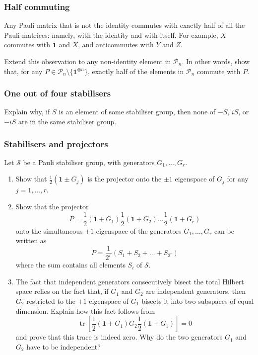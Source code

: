 \documentclass[fleqn,a4paper]{article}
\providecommand{\tightlist}{\setlength{\itemsep}{0pt}\setlength{\parskip}{0pt}}
\theoremstyle{definition}
\theoremstyle{definition}
\theoremstyle{definition}
\theoremstyle{definition}
\theoremstyle{remark}
\begin{document}
\hypertarget{half-commuting}{%
\subsubsection{Half commuting}\label{half-commuting}}

Any Pauli matrix that is not the identity commutes with exactly half of all the Pauli matrices: namely, with the identity and with itself.
For example, \(X\) commutes with \(\mathbf{1}\) and \(X\), and anticommutes with \(Y\) and \(Z\).

Extend this observation to any non-identity element in \(\mathcal{P}_n\).
In other words, show that, for any \(P\in\mathcal{P}_n\setminus\{\mathbf{1}^{\otimes n}\}\), exactly half of the elements in \(\mathcal{P}_n\) commute with \(P\).

\hypertarget{one-out-of-four-stabilisers}{%
\subsubsection{One out of four stabilisers}\label{one-out-of-four-stabilisers}}

Explain why, if \(S\) is an element of some stabiliser group, then none of \(-S\), \(iS\), or \(-iS\) are in the same stabiliser group.

\hypertarget{stabilisers-and-projectors}{%
\subsubsection{Stabilisers and projectors}\label{stabilisers-and-projectors}}

Let \(\mathcal{S}\) be a Pauli stabiliser group, with generators \(G_1,\ldots,G_r\).

\begin{enumerate}
\def\labelenumi{\arabic{enumi}.}
\tightlist
\item
  Show that \(\frac{1}{2}(\mathbf{1}\pm G_j)\) is the projector onto the \(\pm1\) eigenspace of \(G_j\) for any \(j=1,\ldots,r\).
\item
  Show that the projector
  \[
   P = \frac{1}{2}(\mathbf{1}+G_1)\frac{1}{2}(\mathbf{1}+G_2)\ldots\frac{1}{2}(\mathbf{1}+G_r)
    \]
  onto the simultaneous \(+1\) eigenspace of the generators \(G_1,\ldots,G_r\) can be written as
  \[
   P = \frac{1}{2^r}(S_1+S_2+\ldots+S_{2^r})
    \]
  where the sum contains all elements \(S_i\) of \(\mathcal{S}\).
\item
  The fact that independent generators consecutively bisect the total Hilbert space relies on the fact that, if \(G_1\) and \(G_2\) are independent generators, then \(G_2\) restricted to the \(+1\) eigenspace of \(G_1\) bisects it into two subspaces of equal dimension.
  Explain how this fact follows from
  \[
   \operatorname{tr}\left[
     \frac{1}{2}(\mathbf{1}+G_1)G_2\frac{1}{2}(\mathbf{1}+G_1)
   \right] = 0
    \]
  and prove that this trace is indeed zero.
  Why do the two generators \(G_1\) and \(G_2\) have to be independent?
\end{enumerate}
\end{document}
